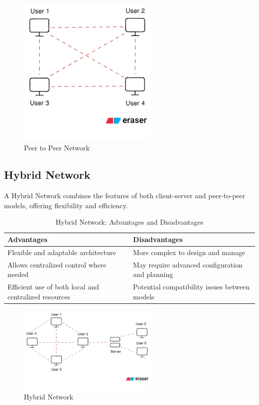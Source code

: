 \begin{figure}[H]
    \centering
    \includegraphics[width=0.6\textwidth]{images/chapter2/p2p.png}
    \caption{Peer to Peer Network}
    \label{fig:p2p}
\end{figure}


\subsection{Hybrid Network}
A Hybrid Network combines the features of both client-server and peer-to-peer models, offering flexibility and efficiency.

\begin{table}[H]
\centering
\caption{Hybrid Network: Advantages and Disadvantages}
\begin{tabularx}{\linewidth}{|X|X|}
\hline
\textbf{Advantages} & \textbf{Disadvantages} \\
\hline
Flexible and adaptable architecture & More complex to design and manage \\
\hline
Allows centralized control where needed & May require advanced configuration and planning \\
\hline
Efficient use of both local and centralized resources & Potential compatibility issues between models \\
\hline
\end{tabularx}
\end{table}


\begin{figure}[H]
    \centering
    \includegraphics[width=0.6\textwidth]{images/chapter2/hybrid.png}
    \caption{Hybrid Network}
    \label{fig:hybrid-network}
\end{figure}



